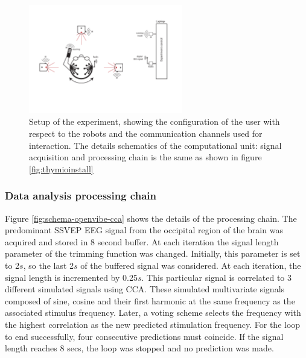 \documentclass{svmult}
\begin{document}
\begin{figure}
\center
\includegraphics[width=0.6\textwidth]{figures/schema-global2.pdf}
\caption{Setup of the experiment, showing the configuration of the user with respect to the robots and the communication channels used for interaction. The details schematics of the computational unit: signal acquisition and processing chain is the same as shown in figure \ref{fig:thymioinstall}} \label{fig:experiment-set-up}
\end{figure}

\subsubsection{Data analysis processing chain}
Figure \ref{fig:schema-openvibe-cca} shows the details of the processing chain. The predominant SSVEP EEG signal from the occipital region of the brain was acquired and stored in 8 second buffer. At each iteration the signal length parameter of the trimming function was changed. Initially, this parameter is set to 2$s$, so the last 2$s$ of the buffered signal was considered. At each iteration, the signal length is incremented by 0.25$s$. This particular signal is correlated to 3 different simulated signals using CCA. These simulated multivariate signals composed of sine, cosine and their first harmonic at the same frequency as the associated stimulus frequency. Later, a voting scheme selects the frequency with the highest correlation as the new predicted stimulation frequency. For the loop to end successfully, four consecutive predictions must coincide. If the signal length reaches 8 secs, the loop was stopped and no prediction was made.
\end{document}
